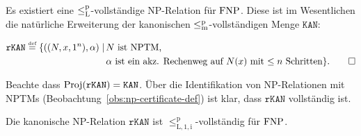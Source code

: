 Es existiert eine $\leq_\mathrm{L}^\mathrm{p}$-vollständige NP-Relation für $\mathrm{FNP}$. Diese ist im Wesentlichen die natürliche Erweiterung der kanonischen $\leq_\mathrm{m}^\mathrm{p}$-vollständigen Menge $\mathtt{KAN}$:
\begin{definition}
\[ \begin{split} \mathtt{rKAN} \stackrel{\text{{\normalfont\tiny def}}}{=} \{ ((N,x,1^n), \alpha) \mid\, &\text{$N$ ist NPTM,}\\ &\text{$\alpha$ ist ein akz. Rechenweg auf $N(x)$ mit $\leq n$ Schritten} \}.\qedhere\end{split} \]
\end{definition}
Beachte dass $\operatorname{Proj}(\mathtt{rKAN})=\mathtt{KAN}$.
Über die Identifikation von NP-Relationen mit NPTMs (Beobachtung~\ref{obs:np-certificate-def}) ist klar, dass $\mathtt{rKAN}$ vollständig ist.
\begin{theorem}
    Die kanonische NP-Relation $\mathtt{rKAN}$ 
    ist $\leq_\mathrm{L,1,i}^\mathrm p$-vollständig für $\mathrm{FNP}$.
\end{theorem}
% 
% 
% 

